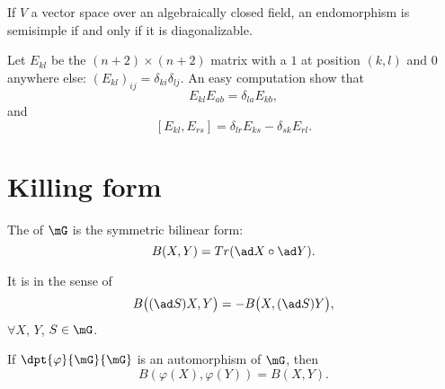 \begin{proposition}
    If \( V\) a vector space over an algebraically closed field, an endomorphism is semisimple if and only if it is diagonalizable.
\end{proposition}

\label{pg:E_ij}Let $E_{kl}$ be the $(n+2)\times(n+2)$ matrix with a $1$ at position $(k,l)$ and $0$ anywhere else: $(E_{kl})_{ij}=\delta_{ki}\delta_{lj}$. An easy computation show that 
\begin{equation}        \label{EqFormMulEmtr}       %
    E_{kl}E_{ab}=\delta_{la}E_{kb},
\end{equation}
and
\begin{equation}\label{comm_de_E}
    [E_{kl},E_{rs}]=\delta_{lr}E_{ks}-\delta_{sk}E_{rl}.
\end{equation}

\section{Killing form}

\begin{definition}
    The  of $\mG$ is the symmetric bilinear form:
    \begin{equation}
                 B(X,Y)=Tr(\ad X\circ \ad Y).
    \end{equation}
\end{definition}

\begin{proposition}
    It is  in the sense of
    \begin{equation}                        \label{eq:Killing_invariant}
         B\big((\ad S)X,Y\big)=-B\big(X,(\ad S)Y\big),
    \end{equation}
    $\forall X$, $Y$, $S\in\mG$.
\end{proposition}

\begin{proposition} \label{PropAutomInvarB}
If $\dpt{\varphi}{\mG}{\mG}$ is an automorphism of $\mG$, then
\[
   B(\varphi(X),\varphi(Y))=B(X,Y).
\]
\label{prop:auto_2}
\end{proposition}

